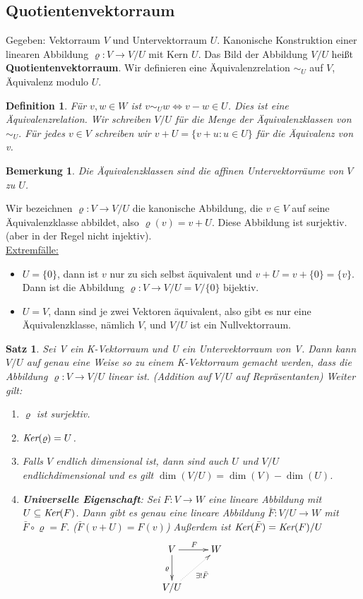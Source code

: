 \documentclass[12pt,a4paper]{article}
\theoremstyle{plain}
\newtheorem{Satz}[Theorem]{Satz}
\newtheorem{Definition}[Theorem]{Definition}
\newtheorem{Bemerkung}[Theorem]{Bemerkung}
\newcommand{\herv}[1]{{\emph{\textbf{#1}}}}
\numberwithin{equation}{section}
\begin{document}
\subsection{Quotientenvektorraum}
Gegeben: Vektorraum $V$ und Untervektorraum $U$. Kanonische Konstruktion einer linearen Abbildung $\varrho : V \rightarrow V/U$ mit Kern $U$. Das Bild der Abbildung $V/U$ heißt \textbf{Quotientenvektorraum}. Wir definieren eine Äquivalenzrelation $\sim_U$ auf $V$, \glqq Äquivalenz modulo $U$\grqq.
\begin{Definition}
Für $v,w\in W$ ist $v\sim_U w \Leftrightarrow v-w \in U$. Dies ist eine Äquivalenzrelation. Wir schreiben $V/U$ für die Menge der Äquivalenzklassen von $\sim_U.$ Für jedes $v\in V$ schreiben wir $v+U=\{v+u:u\in U\}$ für die Äquivalenz von v.
\end{Definition}
\begin{Bemerkung}
Die Äquivalenzklassen sind die affinen Untervektorräume von $V$ zu $U$.
\end{Bemerkung}
Wir bezeichnen $\varrho:V\rightarrow V/U$ die kanonische Abbildung, die $v\in V$ auf seine Äquivalenzklasse abbildet, also $\varrho(v)=v+U$. Diese Abbildung ist surjektiv. (aber in der Regel nicht injektiv). \\
\underline{Extremfälle:} \begin{itemize}
\item $U=\{0\}$, dann ist $v$ nur zu sich selbst äquivalent und $v+U=v+\{0\}=\{v\}$. Dann ist die Abbildung $\varrho : V\rightarrow V/U=V/\{0\}$ bijektiv.
\item $U=V$, dann sind je zwei Vektoren äquivalent, also gibt es nur eine Äquivalenzklasse, nämlich $V$, und $V/U$ ist ein Nullvektorraum.
\end{itemize}
\begin{Satz}
Sei V ein K-Vektorraum und U ein Untervektorraum von V. Dann kann $V/U$ auf genau eine Weise so zu einem K-Vektorraum gemacht werden, dass die Abbildung $\varrho:V\rightarrow V/U$ linear ist. (Addition auf $V/U$ auf Repräsentanten) Weiter gilt:
\begin{enumerate}
\renewcommand{\labelenumi}{\emph{\arabic{enumi})}}
\item $\varrho$ ist surjektiv.
\item $\emph{Ker}(\varrho)=U$.
\item Falls $V$ endlich dimensional ist, dann sind auch $U$ und $V/U$ endlichdimensional und es gilt $\dim(V/U)=\dim(V)-\dim(U)$.
\item \herv{Universelle Eigenschaft}: Sei $F:V\rightarrow W$ eine lineare Abbildung mit $U\subseteq \emph{Ker}(F)$. Dann gibt es genau eine lineare Abbildung $\bar{F}:V/U\rightarrow W$ mit $\bar{F}\circ \varrho=F$. ($\bar{F}(v+U)=F(v)$) Außerdem ist $\emph{Ker}(\bar{F})=\emph{Ker}(F)/U$
\[ \begin{xy}
	\xymatrix{
		V \ar[r]^F \ar[d]_\varrho & W \\
		V/U \ar@{.>}[ru]_{\exists ! \bar{F}}
	}
\end{xy} \]
\end{enumerate}
\end{Satz}
\end{document}
